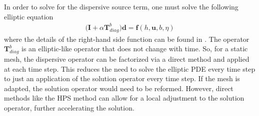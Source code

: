 In order to solve for the dispersive source term, one must solve the following elliptic equation
\begin{align}
    \big( \textbf{I} + \alpha \textbf{T}_{diag}^b \big) \textbf{d} = \textbf{f}(h, \textbf{u}, b, \eta)
\end{align}
where the details of the right-hand side function can be found in \citep{lannes2015new}. The operator $\textbf{T}_{diag}^b$ is an elliptic-like operator that does not change with time. So, for a static mesh, the dispersive operator can be factorized via a direct method and applied at each time step. This reduces the need to solve the elliptic PDE every time step to just an application of the solution operator every time step. If the mesh is adapted, the solution operator would need to be reformed. However, direct methods like the HPS method can allow for a local adjustment to the solution operator, further accelerating the solution.
